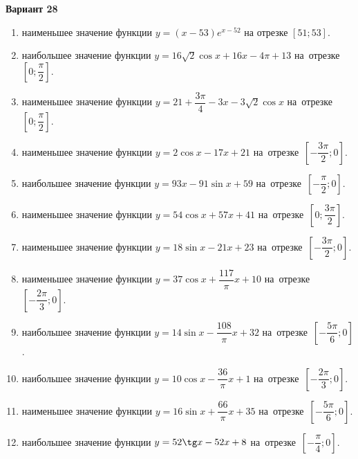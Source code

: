 \documentclass[a4paper,10pt]{article}
\begin{document}
\begin{center}\Large\textbf{Вариант 28}\end{center}

\begin{enumerate}
\item {} наименьшее значение функции $y = \left(x-53\right)e^{x-52}$ на отрезке $\left[51;53\right]$.

\item {} наибольшее значение функции $y = 16\sqrt{2}\cos x+16x-4\pi +13$ на~отрезке~$\left[0;\dfrac{\pi }{2}\right]$.

\item {} наименьшее значение функции $y = 21+\dfrac{3 \pi}{4}-3x-3\sqrt{2}\cos x$ на~отрезке~$\left[0;\dfrac{\pi }{2}\right]$.

\item {} наименьшее значение функции $y = 2\cos x-17x+21$ на~отрезке~$\left[-\dfrac{3\pi }{2};0\right]$.

\item {} наибольшее значение функции $y = 93x-91\sin x+59$ на~отрезке~$\left[-\dfrac{\pi }{2};0\right]$.

\item {} наименьшее значение функции $y = 54\cos x+57x+41$ на~отрезке~$\left[0;\dfrac{3\pi }{2}\right]$.

\item {} наименьшее значение функции $y = 18\sin x-21x+23$ на~отрезке~$\left[-\dfrac{3\pi }{2};0\right]$.

\item {} наименьшее значение функции $y = 37\cos x+\dfrac{117}{\pi }x +10$ на~отрезке~$\left[-\dfrac{2\pi }{3};0\right]$.

\item {} наибольшее значение функции $y = 14\sin x-\dfrac{108}{\pi }x+32$ на~отрезке~$\left[-\dfrac{5\pi }{6};0\right]$.

\item {} наибольшее значение функции $y = 10\cos x-\dfrac{36}{\pi }x+1$ на~отрезке~$\left[-\dfrac{2\pi }{3};0\right]$.

\item {} наименьшее значение функции $y = 16\sin x+\dfrac{66}{\pi }x+35$ на~отрезке~$\left[-\dfrac{5\pi }{6};0\right]$.

\item {} наибольшее значение функции $y = 52\tg x-52x+8$ на~отрезке~$\left[-\dfrac{\pi }{4};0\right]$.


\end{enumerate}
\end{document}
